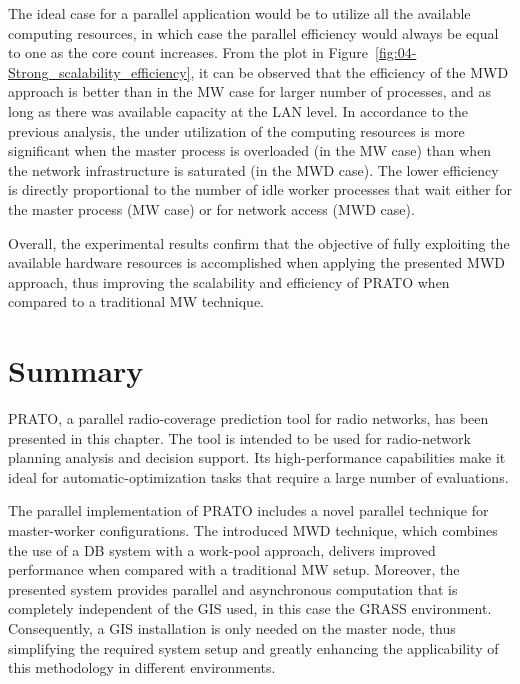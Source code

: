 The ideal case for a parallel application would be to utilize all
the available computing resources, in which case the parallel efficiency
would always be equal to one as the core count increases. From the
plot in Figure~\ref{fig:04-Strong_scalability_efficiency}, it can
be observed that the efficiency of the MWD approach is better than
in the MW case for larger number of processes, and as long as there
was available capacity at the LAN level. In accordance to the previous
analysis, the under utilization of the computing resources is more
significant when the master process is overloaded (in the MW case)
than when the network infrastructure is saturated (in the MWD case).
The lower efficiency is directly proportional to the number of idle
worker processes that wait either for the master process (MW case)
or for network access (MWD case).

Overall, the experimental results confirm that the objective of fully
exploiting the available hardware resources is accomplished when applying
the presented MWD approach, thus improving the scalability and efficiency
of PRATO when compared to a traditional MW technique.




\section{Summary \label{sec:04-Summary}}

PRATO, a parallel radio-coverage prediction tool for radio networks,
has been presented in this chapter. The tool is intended to be used
for radio-network planning analysis and decision support. Its high-performance
capabilities make it ideal for automatic-optimization tasks that require
a large number of evaluations.

The parallel implementation of PRATO includes a novel parallel technique
for master-worker configurations. The introduced MWD technique, which
combines the use of a DB system with a work-pool approach, delivers
improved performance when compared with a traditional MW setup. Moreover,
the presented system provides parallel and asynchronous computation
that is completely independent of the GIS used, in this case the GRASS
environment. Consequently, a GIS installation is only needed on the
master node, thus simplifying the required system setup and greatly
enhancing the applicability of this methodology in different environments.

